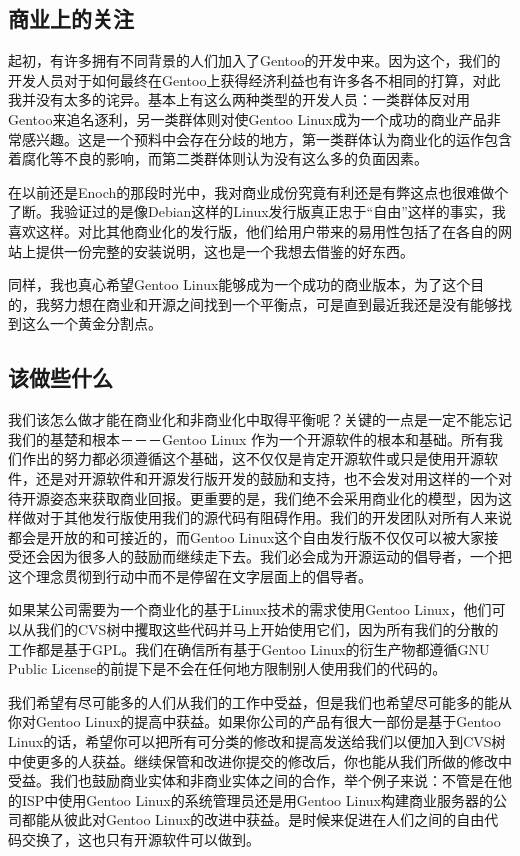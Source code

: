 \subsection{商业上的关注}

起初，有许多拥有不同背景的人们加入了Gentoo的开发中来。因为这个，我们的开发人员对于如何最终在Gentoo上获得经济利益也有许多各不相同的打算，对此我并没有太多的诧异。基本上有这么两种类型的开发人员：一类群体反对用Gentoo来追名逐利，另一类群体则对使Gentoo Linux成为一个成功的商业产品非常感兴趣。这是一个预料中会存在分歧的地方，第一类群体认为商业化的运作包含着腐化等不良的影响，而第二类群体则认为没有这么多的负面因素。

在以前还是Enoch的那段时光中，我对商业成份究竟有利还是有弊这点也很难做个了断。我验证过的是像Debian这样的Linux发行版真正忠于“自由”这样的事实，我喜欢这样。对比其他商业化的发行版，他们给用户带来的易用性包括了在各自的网站上提供一份完整的安装说明，这也是一个我想去借鉴的好东西。

同样，我也真心希望Gentoo Linux能够成为一个成功的商业版本，为了这个目的，我努力想在商业和开源之间找到一个平衡点，可是直到最近我还是没有能够找到这么一个黄金分割点。

\subsection{该做些什么}

我们该怎么做才能在商业化和非商业化中取得平衡呢？关键的一点是一定不能忘记我们的基楚和根本－－－Gentoo Linux 作为一个开源软件的根本和基础。所有我们作出的努力都必须遵循这个基础，这不仅仅是肯定开源软件或只是使用开源软件，还是对开源软件和开源发行版开发的鼓励和支持，也不会发对用这样的一个对待开源姿态来获取商业回报。更重要的是，我们绝不会采用商业化的模型，因为这样做对于其他发行版使用我们的源代码有阻碍作用。我们的开发团队对所有人来说都会是开放的和可接近的，而Gentoo Linux这个自由发行版不仅仅可以被大家接受还会因为很多人的鼓励而继续走下去。我们必会成为开源运动的倡导者，一个把这个理念贯彻到行动中而不是停留在文字层面上的倡导者。

如果某公司需要为一个商业化的基于Linux技术的需求使用Gentoo Linux，他们可以从我们的CVS树中攫取这些代码并马上开始使用它们，因为所有我们的分散的工作都是基于GPL。我们在确信所有基于Gentoo Linux的衍生产物都遵循GNU Public License的前提下是不会在任何地方限制别人使用我们的代码的。

我们希望有尽可能多的人们从我们的工作中受益，但是我们也希望尽可能多的能从你对Gentoo Linux的提高中获益。如果你公司的产品有很大一部份是基于Gentoo Linux的话，希望你可以把所有可分类的修改和提高发送给我们以便加入到CVS树中使更多的人获益。继续保管和改进你提交的修改后，你也能从我们所做的修改中受益。我们也鼓励商业实体和非商业实体之间的合作，举个例子来说：不管是在他的ISP中使用Gentoo Linux的系统管理员还是用Gentoo Linux构建商业服务器的公司都能从彼此对Gentoo Linux的改进中获益。是时候来促进在人们之间的自由代码交换了，这也只有开源软件可以做到。

